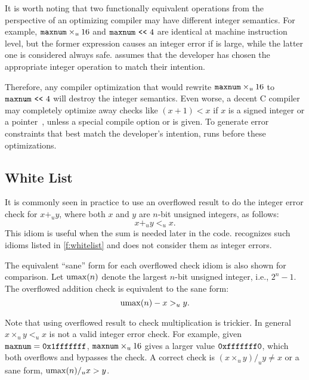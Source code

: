 It is worth noting that two functionally equivalent operations from
the perspective of an optimizing compiler may have different integer
semantics.  For example, $\texttt{maxnum}\times_u 16$ and $\texttt{maxnum}
\ \texttt{<}\texttt{<}\  4$ are identical at machine instruction level, but the former
expression causes an integer error if  is large, while
the latter one is considered always safe.  \sys assumes that the
developer has chosen the appropriate integer operation to match
their intention.

Therefore, any compiler optimization that would rewrite
$\texttt{maxnum}\times_u 16$ to $\texttt{maxnum} \ \texttt{<}\texttt{<}\  4$ will destroy the
integer semantics.  Even worse, a decent C compiler may completely
optimize away checks like $(x + 1) < x$ if $x$ is a signed integer
or a pointer~\cite{gcc:signed-overflow,us-cert:gcc}, unless a special
compile option  or  is given.
To generate error constraints that best match the developer's
intention, \sys runs before these optimizations.

\subsection{White List}
\label{s:sema:whitelist}

It is commonly seen in practice to use an overflowed result to do
the integer error check for $x +_u y$, where both $x$ and $y$ are
$n$-bit unsigned integers, as follows:
\begin{equation*}
x +_u y <_u x.
\end{equation*}
This idiom is useful when the sum is needed later in the code.
\sys recognizes such idioms listed in \autoref{f:whitelist} and
does not consider them as integer errors.

The equivalent ``sane'' form for each overflowed check idiom is
also shown for comparison.  Let $\operatorname{umax}(n)$ denote the largest $n$-bit
unsigned integer, i.e., $2^n - 1$.  The overflowed addition check
is equivalent to the sane form:
\begin{equation*}
\operatorname{umax}(n) - x >_u y.
\end{equation*}

Note that using overflowed result to check multiplication is trickier.
In general $x \times_u y <_u x$ is not a valid integer error check.
For example, given $\texttt{maxnum} = \texttt{0x1fffffff}$, $\texttt{maxnum}
\times_u 16$ gives a larger value $\texttt{0xfffffff0}$, which both
overflows and bypasses the check.  A correct check is $(x \times_u
y) /_u y \neq x$ or a sane form, $\operatorname{umax}(n) /_u x > y$.

